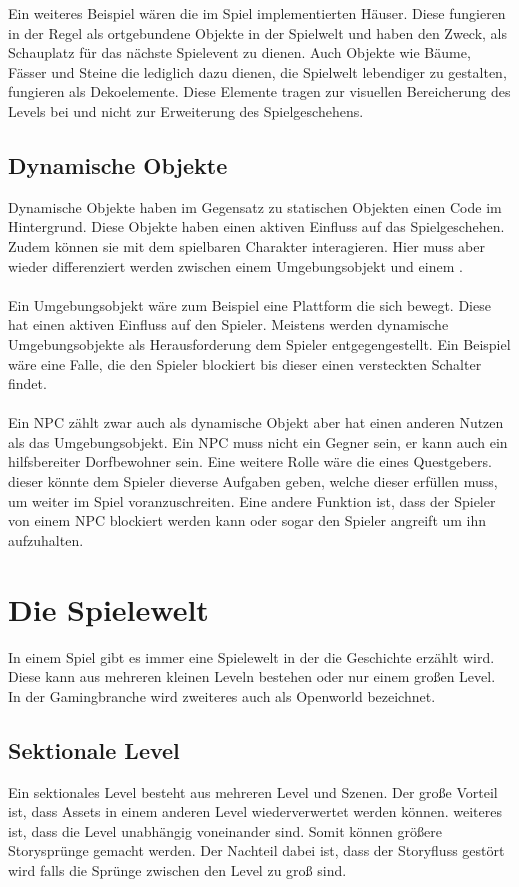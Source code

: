 Ein weiteres Beispiel wären die im Spiel implementierten Häuser. Diese fungieren in der Regel als ortgebundene Objekte in der Spielwelt und haben den Zweck, als Schauplatz für das nächste Spielevent zu dienen. Auch Objekte wie Bäume, Fässer und Steine die lediglich dazu dienen, die Spielwelt lebendiger zu gestalten, fungieren als Dekoelemente. Diese Elemente tragen zur visuellen Bereicherung des Levels bei und nicht zur Erweiterung des Spielgeschehens. 


\subsection{Dynamische Objekte}
Dynamische Objekte haben im Gegensatz zu statischen Objekten einen Code im Hintergrund. Diese Objekte haben einen aktiven Einfluss auf das Spielgeschehen. Zudem können sie mit dem spielbaren Charakter interagieren. Hier muss aber wieder differenziert werden zwischen einem Umgebungsobjekt und einem .\\\\
Ein Umgebungsobjekt wäre zum Beispiel eine Plattform die sich bewegt. Diese hat einen aktiven Einfluss auf den Spieler. Meistens werden dynamische Umgebungsobjekte als Herausforderung dem Spieler entgegengestellt. Ein Beispiel wäre eine Falle, die den Spieler blockiert bis dieser einen versteckten Schalter findet. 
\\\\
Ein NPC zählt zwar auch als dynamische Objekt aber hat einen anderen Nutzen als das Umgebungsobjekt. Ein NPC muss nicht ein Gegner sein, er kann auch ein hilfsbereiter Dorfbewohner sein. Eine weitere Rolle wäre die eines Questgebers. dieser könnte dem Spieler dieverse Aufgaben geben, welche dieser erfüllen muss, um weiter im Spiel voranzuschreiten. Eine andere Funktion ist, dass der Spieler von einem NPC blockiert werden kann oder sogar den Spieler angreift um ihn aufzuhalten.

\pagebreak

\section{Die Spielewelt}
In einem Spiel gibt es immer eine Spielewelt in der die Geschichte erzählt wird. Diese kann aus mehreren kleinen Leveln bestehen oder nur einem großen Level. In der Gamingbranche wird zweiteres auch als Openworld bezeichnet.


\subsection {Sektionale Level}
Ein sektionales Level besteht aus mehreren Level und Szenen. Der große Vorteil ist, dass Assets in einem anderen Level wiederverwertet werden können. weiteres ist, dass die Level unabhängig voneinander sind. Somit können größere Storysprünge gemacht werden. Der Nachteil dabei ist, dass der Storyfluss  gestört wird falls die Sprünge zwischen den Level zu groß sind. 

